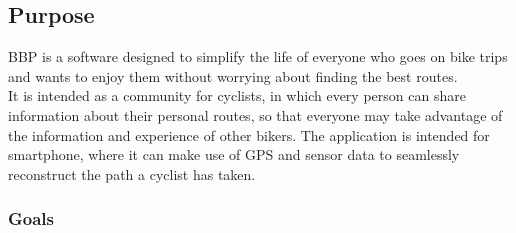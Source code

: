 \subsection{Purpose}
BBP is a software designed to simplify the life of everyone who goes on bike trips and wants to enjoy them without worrying about finding the best routes.\\
It is intended as a community for cyclists, in which every person can share information about their personal routes, so that everyone may take advantage of the information and experience of other bikers.
The application is intended for smartphone, where it can make use of GPS and sensor data to seamlessly reconstruct the path a cyclist has taken.

\subsubsection{Goals}
